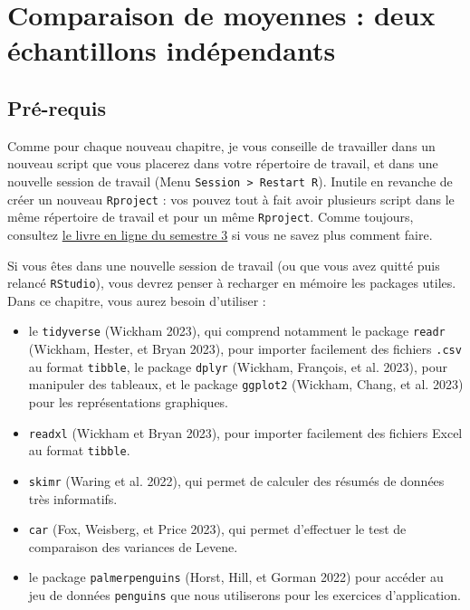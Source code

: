 \documentclass[
  a4paper,
  DIV=11,
  numbers=noendperiod,
  oneside]{scrreprt}
\providecommand{\tightlist}{%
  \setlength{\itemsep}{0pt}\setlength{\parskip}{0pt}}\usepackage{longtable,booktabs,array}
\begin{document}

\hypertarget{sec-moy3}{%
\chapter{Comparaison de moyennes : deux échantillons
indépendants}\label{sec-moy3}}

\hypertarget{sec-packages3}{%
\section{Pré-requis}\label{sec-packages3}}

Comme pour chaque nouveau chapitre, je vous conseille de travailler dans
un nouveau script que vous placerez dans votre répertoire de travail, et
dans une nouvelle session de travail (Menu
\texttt{Session\ \textgreater{}\ Restart\ R}). Inutile en revanche de
créer un nouveau \texttt{Rproject} : vos pouvez tout à fait avoir
plusieurs script dans le même répertoire de travail et pour un même
\texttt{Rproject}. Comme toujours, consultez
\href{https://besibo.github.io/BiometrieS3/01-R-basics.html\#sec-code}{le
livre en ligne du semestre 3} si vous ne savez plus comment faire.

Si vous êtes dans une nouvelle session de travail (ou que vous avez
quitté puis relancé \texttt{RStudio}), vous devrez penser à recharger en
mémoire les packages utiles. Dans ce chapitre, vous aurez besoin
d'utiliser :

\begin{itemize}
\tightlist
\item
  le \texttt{tidyverse} (Wickham 2023), qui comprend notamment le
  package \texttt{readr} (Wickham, Hester, et Bryan 2023), pour importer
  facilement des fichiers \texttt{.csv} au format \texttt{tibble}, le
  package \texttt{dplyr} (Wickham, François, et al. 2023), pour
  manipuler des tableaux, et le package \texttt{ggplot2} (Wickham,
  Chang, et al. 2023) pour les représentations graphiques.
\item
  \texttt{readxl} (Wickham et Bryan 2023), pour importer facilement des
  fichiers Excel au format \texttt{tibble}.
\item
  \texttt{skimr} (Waring et al. 2022), qui permet de calculer des
  résumés de données très informatifs.
\item
  \texttt{car} (Fox, Weisberg, et Price 2023), qui permet d'effectuer le
  test de comparaison des variances de Levene.
\item
  le package \texttt{palmerpenguins} (Horst, Hill, et Gorman 2022) pour
  accéder au jeu de données \texttt{penguins} que nous utiliserons pour
  les exercices d'application.
\end{itemize}
\end{document}
